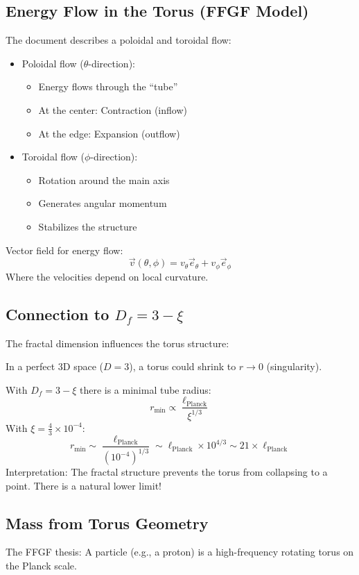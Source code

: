 \documentclass[12pt,a4paper]{article}
\begin{document}
\subsection{Energy Flow in the Torus (FFGF Model)}
The document describes a poloidal and toroidal flow:
\begin{itemize}
	\item Poloidal flow (\( \theta \)-direction):
	\begin{itemize}
		\item Energy flows through the ``tube''
		\item At the center: Contraction (inflow)
		\item At the edge: Expansion (outflow)
	\end{itemize}
	\item Toroidal flow (\( \phi \)-direction):
	\begin{itemize}
		\item Rotation around the main axis
		\item Generates angular momentum
		\item Stabilizes the structure
	\end{itemize}
\end{itemize}

Vector field for energy flow:
\[
\vec{v}(\theta, \phi) = v_\theta \vec{e}_\theta + v_\phi \vec{e}_\phi
\]
Where the velocities depend on local curvature.

\subsection{Connection to \( D_f = 3 - \xi \)}
The fractal dimension influences the torus structure:

In a perfect 3D space (\( D = 3 \)), a torus could shrink to \( r \to 0 \) (singularity).

With \( D_f = 3 - \xi \) there is a minimal tube radius:
\[
r_{\text{min}} \propto \frac{\ell_{\text{Planck}}}{\xi^{1/3}}
\]
With \( \xi = \frac{4}{3} \times 10^{-4} \):
\[
r_{\text{min}} \sim \frac{\ell_{\text{Planck}}}{(10^{-4})^{1/3}} \sim \ell_{\text{Planck}} \times 10^{4/3} \sim 21 \times \ell_{\text{Planck}}
\]
Interpretation: The fractal structure prevents the torus from collapsing to a point. There is a natural lower limit!

\subsection{Mass from Torus Geometry}
The FFGF thesis: A particle (e.g., a proton) is a high-frequency rotating torus on the Planck scale.
\end{document}
